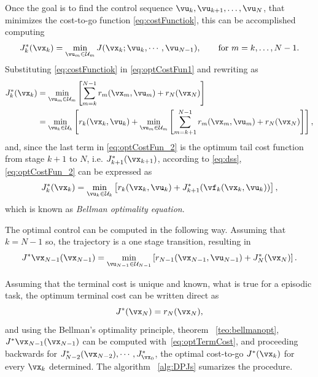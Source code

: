 Once the goal is to find the control sequence $\vu_k, \vu_{k+1}, \dots, \vu_N$, that minimizes the cost-to-go function \eqref{eq:costFunctiok}, this can be accomplished computing
\begin{equation}
    J^*_k(\vx_k) = \min_{\vu_m \in \mathcal{U}_m} J(\vx_k;\vu_k, \cdots, \vu_{N-1}), \qquad \text{for } m=k, \dots, N-1
\label{eq:optCostFun1}.
\end{equation}
Substituting \eqref{eq:costFunctiok} in \eqref{eq:optCostFun1} and rewriting as
\begin{align}
    J^*_k(\vx_k) &= \min_{\vu_m \in \mathcal{U}_m} \left[ \sum_{m=k}^{N-1} r_m(\vx_m,\vu_m) + r_N(\vx_N) \right] \nonumber\\
             &= \min_{\vu_k \in \mathcal{U}_k} \left[ r_k(\vx_k, \vu_k) +\min_{\vu_m \in \mathcal{U}_m} \left[ \sum_{m=k+1}^{N-1} r_m(\vx_m,\vu_m) + r_N(\vx_N) \right]\right] 
\label{eq:optCostFun_2},
\end{align}
and, since the last term in \eqref{eq:optCostFun_2} is the optimum tail cost function from stage $k+1$ to $N$, i.e. $J^*_{k+1}(\vx_{k+1})$, according to \eqref{eq:dss}, \eqref{eq:optCostFun_2} can be expressed as
\begin{equation}
     J^*_k(\vx_k) = \min_{\vu_k \in \mathcal{U}_k} \left[ r_k(\vx_k, \vu_k) + J^*_{k+1} (\vf_k(\vx_k,\vu_k))  \right]
\label{eq:bellmanEquation},
\end{equation}
which is known as \textit{Bellman optimality equation}.

The optimal control can be computed in the following way. 
Assuming that $k = N-1$ so, the trajectory is a one stage transition, resulting in
\begin{equation*}
    J^*\vx_{N-1}(\vx_{N-1}) = \min_{\vu_{N-1} \in \mathcal{U}_{N-1}} \left[ r_{N-1}(\vx_{N-1}, \vu_{N-1}) + J^*_{N}(\vx_N)  \right].
\end{equation*}

Assuming that the terminal cost is unique and known, what is true for a episodic task, the optimum terminal cost can be written direct as
\begin{equation}
    J^*(\vx_N) = r_N(\vx_N)
\label{eq:optTermCost},
\end{equation}
and using the Bellman's optimality principle, theorem ~\ref{teo:bellmanopt}, $J^*\vx_{N-1}(\vx_{N-1})$ can be computed with~\eqref{eq:optTermCost}, and proceeding backwards for $J^*_{N-2}(\vx_{N-2}), \cdots, J^*_{\vx_0}$, the optimal cost-to-go $J^*(\vx_k)$ for every $ \vx_k$ determined. The algorithm ~\ref{alg:DPJs} sumarizes the procedure.

